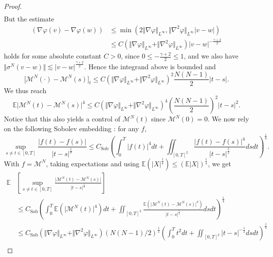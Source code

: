 \documentclass[11pt,a4paper]{article}
\theoremstyle{definition}
\theoremstyle{plain}
\begin{document}
\begin{proof}
\begin{align*}
\end{align*}
But the estimate
\begin{align*}\left(\nabla\varphi\left(v\right)-\nabla\varphi\left(w\right)\right) &\leq  \min(2\Vert \nabla \varphi\Vert_{L^\infty},\Vert \nabla^2 \varphi\Vert_{L^\infty}\vert v-w\vert)\\
&\leq C(\Vert \nabla \varphi\Vert_{L^\infty}+\Vert \nabla^2 \varphi\Vert_{L^\infty})\vert v-w\vert^{-\frac{\gamma+2}{2}}
\end{align*}
holds for some absolute constant $C>0$, since $0\leq -\frac{\gamma+2}{2}\leq 1$, and we also have $\Vert \sigma^N(v-w)\Vert \lesssim  \vert v-w\vert^{\frac{\gamma+2}{2}}.$
Hence the integrand above is bounded and
$$\big[ \mathcal{M}^N(\cdot)-\mathcal{M}^N(s)\big]_t \leq C(\Vert \nabla \varphi\Vert_{L^\infty}+\Vert \nabla^2 \varphi\Vert_{L^\infty})^2 \frac{N(N-1)}{2}\vert t-s\vert.$$
We thus reach
\begin{equation}
\label{eq:holdercontexp}
\mathbb{E} \vert \mathcal{M}^N(t)-\mathcal{M}^N(s) \vert^4 \leq C(\Vert \nabla \varphi\Vert_{L^\infty}+\Vert \nabla^2 \varphi\Vert_{L^\infty})^{4} \left(\frac{N(N-1)}{2}\right)^{2}\vert t-s\vert^2.
\end{equation} 
Notice that this also yields a control of $\mathcal{M}^N(t)$ since $\mathcal{M}^N(0)=0$.
We now rely on the following Sobolev embedding \cite[Theorem 8.2]{NezzaPalatucciValdinoci2011}: for any $f$,
\begin{equation*}
    \sup_{s\neq t \in [0,T]} \frac{\vert f(t)-f(s)\vert}{\vert t-s\vert^{\frac{1}{8}}}\leq C_{\mathrm{Sob}}\left(\int_0^T \vert f(t)\vert^4 dt+\iint_{[0,T]^2} \frac{\vert f(t)-f(s)\vert^4}{\vert t-s\vert^{\frac{5}{2}}}ds dt\right)^{\frac{1}{4}}.
\end{equation*}
With $f=\mathcal{M}^N$, taking expectations and using $\mathbb{E}(\vert X\vert^{\frac{1}{4}}) \leq (\mathbb{E}\vert X\vert)^{\frac{1}{4}}$, we get
\begin{align*}
    \mathbb{E}&\left[ \sup_{s\neq t \in [0,T]} \frac{\vert \mathcal{M}^N(t)-\mathcal{M}^N(s)\vert}{\vert t-s\vert^{\frac{1}{8}}}\right]\\&\leq C_{\mathrm{Sob}}\left(\int_0^T \mathbb{E}(\vert \mathcal{M}^N (t)\vert^4)dt+\iint_{[0,T]^2} \frac{\mathbb{E}(\vert \mathcal{M}^N(t)-\mathcal{M}^N (s)\vert^4)}{\vert t-s\vert^{\frac{5}{2}}}ds dt\right)^{\frac{1}{4}}\\
    &\leq C_{\mathrm{Sob}}(\Vert \nabla \varphi\Vert_{L^\infty}+\Vert \nabla^2 \varphi\Vert_{L^\infty}) (N(N-1)/2)^{\frac{1}{2}}\left(\int_0^T t^2dt+\iint_{[0,T]^2} \vert t-s\vert^{-\frac{1}{2}}ds dt\right)^{\frac{1}{4}}\\

\end{align*}
\end{proof}
\end{document}
